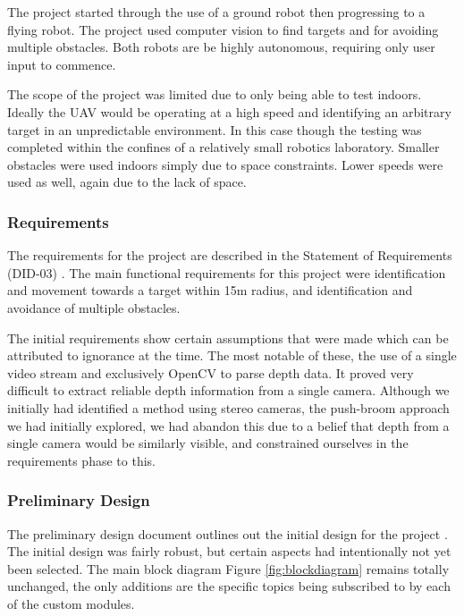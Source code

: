 \documentclass{article}[12]
\begin{document}
		The project started through the use of a ground robot then progressing to a flying robot. The project used computer vision to find targets and for avoiding multiple obstacles. Both robots are be highly autonomous, requiring only user input to commence. 

		The scope of the project was limited due to only being able to test indoors. Ideally the UAV would be operating at a high speed and identifying an arbitrary target in an unpredictable environment. In this case though the testing was completed within the confines of a relatively small robotics laboratory. Smaller obstacles were used indoors simply due to space constraints. Lower speeds were used as well, again due to the lack of space. 


		\subsubsection{Requirements}
		
		The requirements for the project are described in the Statement of Requirements (DID-03) \cite{sor}. The main functional requirements for this project were identification and movement towards a target within 15m radius, and identification and avoidance of multiple obstacles. 
	
		The initial requirements show certain assumptions that were made which can be attributed to ignorance at the time. The most notable of these, the use of a single video stream and exclusively OpenCV to parse depth data. It proved very difficult to extract reliable depth information from a single camera. Although we initially had identified a method using stereo cameras, the push-broom approach \cite{barry2015pushbroom} we had initially explored, we had abandon this due to a belief that depth from a single camera would be similarly visible, and constrained ourselves in the requirements phase to this.

		\subsubsection{Preliminary Design }
		
		The preliminary design document outlines out the initial design for the project \cite{pdd}. The initial design was fairly robust, but certain aspects had intentionally not yet been selected. The main block diagram Figure \ref{fig:blockdiagram} remains totally unchanged, the only additions are the specific topics being subscribed to by each of the custom modules. 
		
\end{document}
